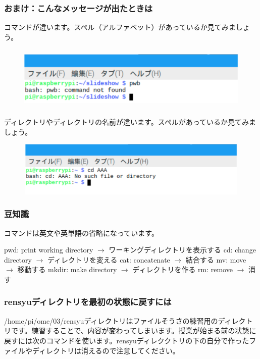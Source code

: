 \documentclass[a4paper,dvipdfmx]{jarticle}
\begin{document}
\subsubsection{おまけ：こんなメッセージが出たときは}
コマンドが違います。スペル（アルファベット）があっているか見てみましょう。



\begin{figure}
\centering
\includegraphics[width=15.136cm,height=3.069cm]{text03-img/text03-img027.png}
\end{figure}
ディレクトリやディレクトリの名前が違います。スペルがあっているか見てみましょう。



\begin{figure}
\centering
\includegraphics[width=17.006cm,height=2.635cm]{text03-img/text03-img028.png}
\end{figure}
\subsubsection{豆知識}
コマンドは英文や英単語の省略になっています。

pwd: print working directory $\rightarrow $
ワーキングディレクトリを表示する\newline
cd: change directory $\rightarrow $ ディレクトリを変える\newline
cat: concatenate $\rightarrow $ 結合する\newline
mv: move $\rightarrow $ 移動する\newline
mkdir: make directory $\rightarrow $ ディレクトリを作る\newline
rm: remove $\rightarrow $ 消す


\bigskip

\subsubsection{rensyuディレクトリを最初の状態に戻すには}
/home/pi/ome/03/rensyuディレクトリはファイルそうさの練習用のディレクトリです。練習することで、内容が変わってしまいます。授業が始まる前の状態に戻すには次のコマンドを使います。rensyuディレククトリの下の自分で作ったファイルやディレクトリは消えるので注意してください。
\end{document}
